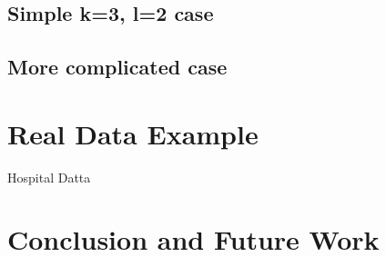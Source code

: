 \documentclass[aoas]{imsart}\usepackage[]{graphicx}\usepackage[]{color}
\begin{document}
\subsection{Simple k=3, l=2 case}

\subsection{More complicated case}

\section{Real Data Example}
Hospital Datta 



\section{Conclusion and Future Work}


\cite{key}





\end{document}
